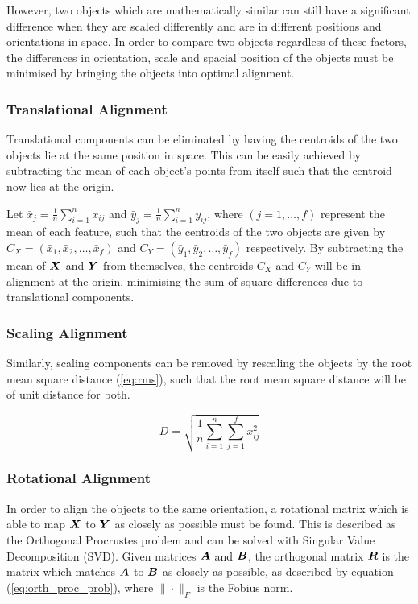 However, two objects which are mathematically similar can still have a significant difference when they are scaled differently and are in different positions and orientations in space.
In order to compare two objects regardless of these factors, the differences in orientation, scale and spacial position of the objects must be minimised by bringing the objects into optimal alignment.

\subsubsection{Translational Alignment} \label{sec:trans_align}
Translational components can be eliminated by having the centroids of the two objects lie at the same position in space.
This can be easily achieved by subtracting the mean of each object's points from itself such that the centroid now lies at the origin.

Let $\bar{x}_j = \frac{1}{n} \sum_{i=1}^{n} x_{ij}$ and $\bar{y}_j = \frac{1}{n} \sum_{i=1}^{n} y_{ij}$, where $(j = 1, \dots, f)$ represent the mean of each feature, such that the centroids of the two objects are given by $C_X = (\bar{x}_1, \bar{x}_2, \dots, \bar{x}_f)$ and $C_Y = (\bar{y}_1, \bar{y}_2, \dots, \bar{y}_f)$ respectively.
By subtracting the mean of ${\boldsymbol{{X}}}$ and ${\boldsymbol{{Y}}}$ from themselves, the centroids $C_X$ and $C_Y$ will be in alignment at the origin, minimising the sum of square differences due to translational components.

\subsubsection{Scaling Alignment} \label{sec:scale_align}
Similarly, scaling components can be removed by rescaling the objects by the root mean square distance (\ref{eq:rms}), such that the root mean square distance will be of unit distance for both.

\begin{equation}
    \label{eq:rms}
    D = \sqrt{\frac{1}{n} \sum_{i=1}^{n} \sum_{j=1}^{f} x_{ij}^2}
\end{equation}

\subsubsection{Rotational Alignment} \label{sec:rot_align}
In order to align the objects to the same orientation, a rotational matrix which is able to map ${\boldsymbol{{X}}}$ to ${\boldsymbol{{Y}}}$ as closely as possible must be found.
This is described as the Orthogonal Procrustes problem and can be solved with Singular Value Decomposition (SVD).
Given matrices ${\boldsymbol{{A}}}$ and ${\boldsymbol{{B}}}$, the orthogonal matrix ${\boldsymbol{{R}}}$ is the matrix which matches ${\boldsymbol{{A}}}$ to ${\boldsymbol{{B}}}$ as closely as possible, as described by equation (\ref{eq:orth_proc_prob}), where $\| \cdot \|_F$ is the Fobius norm.

